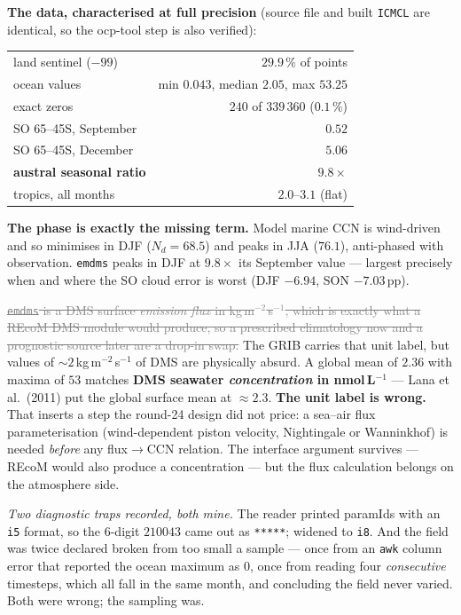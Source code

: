 \documentclass[10pt]{article}
\newcommand{\dead}[1]{\textcolor{gray}{\sout{#1}}}
\begin{document}
\textbf{The data, characterised at full precision} (source file and built \texttt{ICMCL} are
identical, so the ocp-tool step is also verified):

\begin{center}\footnotesize
\begin{tabular}{l r}
\toprule
land sentinel ($-99$) & $29.9\,\%$ of points \\
ocean values & min $0.043$, median $2.05$, max $53.25$ \\
exact zeros & $240$ of $339\,360$ ($0.1\,\%$) \\
\midrule
SO 65--45S, September & $0.52$ \\
SO 65--45S, December & $\mathbf{5.06}$ \\
\textbf{austral seasonal ratio} & $\mathbf{9.8\times}$ \\
tropics, all months & $2.0$--$3.1$ (flat) \\
\bottomrule
\end{tabular}
\end{center}

\noindent \textbf{The phase is exactly the missing term.} Model marine CCN is wind-driven and
so minimises in DJF ($N_d=68.5$) and peaks in JJA ($76.1$), anti-phased with observation.
\texttt{emdms} peaks in DJF at $9.8\times$ its September value --- largest precisely when and
where the SO cloud error is worst (DJF $-6.94$, SON $-7.03$\,pp).

\dead{\texttt{emdms} is a DMS surface \emph{emission flux} in kg\,m$^{-2}$\,s$^{-1}$, which is
exactly what a REcoM DMS module would produce, so a prescribed climatology now and a
prognostic source later are a drop-in swap.} The GRIB carries that unit label, but values of
${\sim}2$\,kg\,m$^{-2}$\,s$^{-1}$ of DMS are physically absurd. A global mean of $2.36$ with
maxima of $53$ matches \textbf{DMS seawater \emph{concentration} in nmol\,L$^{-1}$} --- Lana
et al.\ (2011) put the global surface mean at ${\approx}2.3$. \textbf{The unit label is
wrong.} That inserts a step the round-24 design did not price: a sea--air flux
parameterisation (wind-dependent piston velocity, Nightingale or Wanninkhof) is needed
\emph{before} any flux$\to$CCN relation. The interface argument survives --- REcoM would also
produce a concentration --- but the flux calculation belongs on the atmosphere side.

\emph{Two diagnostic traps recorded, both mine.} The reader printed paramIds with an
\texttt{i5} format, so the 6-digit $210043$ came out as \texttt{*****}; widened to \texttt{i8}.
And the field was twice declared broken from too small a sample --- once from an \texttt{awk}
column error that reported the ocean maximum as $0$, once from reading four \emph{consecutive}
timesteps, which all fall in the same month, and concluding the field never varied. Both were
wrong; the sampling was.
\end{document}
